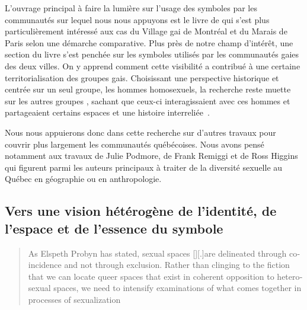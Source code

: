 L'ouvrage principal à faire la lumière sur l'usage des symboles par les communautés \lgbt{} sur lequel nous nous appuyons est le livre  de \citet{Giraud2014} qui s'est plus particulièrement intéressé aux cas du Village gai de Montréal et du Marais de Paris selon une démarche comparative. 
Plus près de notre champ d'intérêt, une section du livre s'est penchée sur les symboles utilisés par les communautés gaies des deux villes. 
On y apprend comment cette visibilité a contribué à une certaine territorialisation des groupes gais. 
Choisissant une perspective historique et centrée sur un seul groupe, les hommes homosexuels, la recherche reste muette sur les autres groupes \lgbt{}, sachant que ceux-ci interagissaient avec ces hommes et partageaient certains espaces et une histoire interreliée~\citep{Remiggi2000,Demczuk1998,Podmore2001,Higgins1997,Higgins1999}.

Nous nous appuierons donc dans cette recherche sur d'autres travaux pour couvrir plus largement les communautés \lgbt{} québécoises. 
Nous avons pensé notamment aux travaux de Julie Podmore, de Frank Remiggi et de Ross Higgins qui figurent parmi les auteurs principaux à traiter de la diversité sexuelle au Québec en géographie ou en anthropologie.

\subsection{Vers une vision hétérogène de l'identité, de l'espace et de l'essence du symbole}
\label{sec:vers_une_vision_h_t_rog_ne_de_l_identit_de_l_espace_et_de_l_essence_du_symbole}
 \foreignblockquote{english}[{\cite[tel que cité
  dans][97]{Oswin2008}}][.]{As Elspeth Probyn has stated, sexual spaces [{\citeyear[10]{Probyn1996}}][.]{are delineated through coincidence and not through exclusion}. Rather than clinging to the fiction that we can locate queer spaces that exist in coherent opposition to heterosexual spaces, we need to intensify examinations of what comes together in processes of sexualization}

